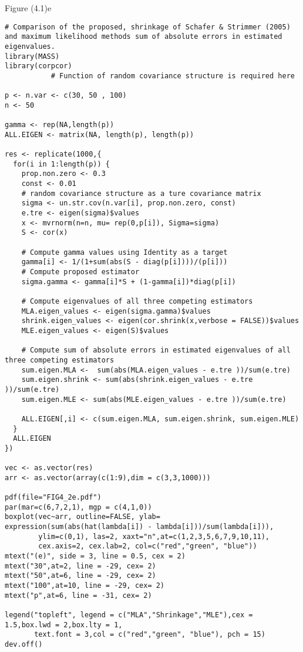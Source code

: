 Figure (4.1)e
\begin{lstlisting}
# Comparison of the proposed, shrinkage of Schafer & Strimmer (2005) and maximum likelihood methods sum of absolute errors in estimated eigenvalues.
library(MASS)
library(corpcor)
           # Function of random covariance structure is required here

p <- n.var <- c(30, 50 , 100)
n <- 50

gamma <- rep(NA,length(p))
ALL.EIGEN <- matrix(NA, length(p), length(p))

res <- replicate(1000,{
  for(i in 1:length(p)) {
    prop.non.zero <- 0.3
    const <- 0.01
    # random covariance structure as a ture covariance matrix 
    sigma <- un.str.cov(n.var[i], prop.non.zero, const)
    e.tre <- eigen(sigma)$values
    x <- mvrnorm(n=n, mu= rep(0,p[i]), Sigma=sigma)
    S <- cor(x)
    
    # Compute gamma values using Identity as a target
    gamma[i] <- 1/(1+sum(abs(S - diag(p[i])))/(p[i]))
    # Compute proposed estimator
    sigma.gamma <- gamma[i]*S + (1-gamma[i])*diag(p[i])
    
    # Compute eigenvalues of all three competing estimators
    MLA.eigen_values <- eigen(sigma.gamma)$values
    shrink.eigen_values <- eigen(cor.shrink(x,verbose = FALSE))$values
    MLE.eigen_values <- eigen(S)$values
    
    # Compute sum of absolute errors in estimated eigenvalues of all three competing estimators
    sum.eigen.MLA <-  sum(abs(MLA.eigen_values - e.tre ))/sum(e.tre)
    sum.eigen.shrink <- sum(abs(shrink.eigen_values - e.tre ))/sum(e.tre)
    sum.eigen.MLE <- sum(abs(MLE.eigen_values - e.tre ))/sum(e.tre)
    
    ALL.EIGEN[,i] <- c(sum.eigen.MLA, sum.eigen.shrink, sum.eigen.MLE)
  }
  ALL.EIGEN
})

vec <- as.vector(res)
arr <- as.vector(array(c(1:9),dim = c(3,3,1000)))

pdf(file="FIG4_2e.pdf")
par(mar=c(6,7,2,1), mgp = c(4,1,0))
boxplot(vec~arr, outline=FALSE, ylab= expression(sum(abs(hat(lambda[i]) - lambda[i]))/sum(lambda[i])),
        ylim=c(0,1), las=2, xaxt="n",at=c(1,2,3,5,6,7,9,10,11),
        cex.axis=2, cex.lab=2, col=c("red","green", "blue"))
mtext("(e)", side = 3, line = 0.5, cex = 2)
mtext("30",at=2, line = -29, cex= 2)
mtext("50",at=6, line = -29, cex= 2)
mtext("100",at=10, line = -29, cex= 2)
mtext("p",at=6, line = -31, cex= 2)

legend("topleft", legend = c("MLA","Shrinkage","MLE"),cex = 1.5,box.lwd = 2,box.lty = 1,
       text.font = 3,col = c("red","green", "blue"), pch = 15)
dev.off()
\end{lstlisting}

